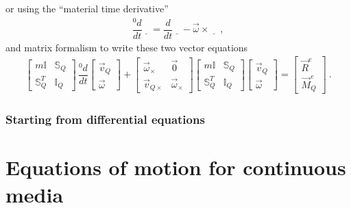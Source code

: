 \documentclass[letterpaper,10pt,english]{jupyterBook}
\begin{document}
\sphinxAtStartPar
or using the “material time derivative”
\begin{equation*}
\begin{split}\dfrac{{}^0 d}{dt} \underline{\hspace{10pt}} = \dfrac{d}{dt} \underline{\hspace{10pt}} - \vec{\omega} \times \underline{\hspace{10pt}} \ ,\end{split}
\end{equation*}
\sphinxAtStartPar
and matrix formalism to write these two vector equations
\begin{equation*}
\begin{split}
\begin{bmatrix} m \mathbb{I} & \mathbb{S}_Q \\ \mathbb{S}_Q^T & \mathbb{I}_Q \end{bmatrix} \, \dfrac{{}^0 d}{dt} \begin{bmatrix} \vec{v}_Q \\ \vec{\omega} \end{bmatrix} + \begin{bmatrix} \vec{\omega}_\times & \vec{0} \\ \vec{v}_{Q \times} & \vec{\omega}_{\times} \end{bmatrix} \begin{bmatrix} m \mathbb{I} & \mathbb{S}_Q \\ \mathbb{S}_Q^T & \mathbb{I}_Q \end{bmatrix} \begin{bmatrix} \vec{v}_Q \\ \vec{\omega} \end{bmatrix} = \begin{bmatrix} \vec{R}^e \\ \vec{M}_Q^e \end{bmatrix} \ .
\end{split}
\end{equation*}\subsubsection*{Starting from differential equations}

\sphinxAtStartPar
{}

\sphinxstepscope




\section{Equations of motion for continuous media}
\label{\detokenize{ch/dynamics-eom-continuum:equations-of-motion-for-continuous-media}}\label{\detokenize{ch/dynamics-eom-continuum:classical-mechanics-dynamics-eom-continuum}}\label{\detokenize{ch/dynamics-eom-continuum::doc}}
\sphinxstepscope
\end{document}
